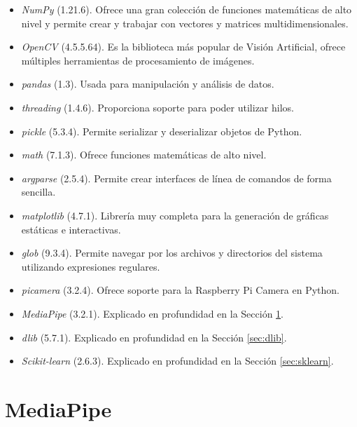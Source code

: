 \begin{itemize}
    \item \textit{NumPy} (1.21.6). Ofrece una gran colección de funciones matemáticas de alto nivel y permite crear y trabajar con vectores y matrices multidimensionales.
    
    \item \textit{OpenCV} (4.5.5.64). Es la biblioteca más popular de Visión Artificial, ofrece múltiples herramientas de procesamiento de imágenes.
    
    \item \textit{pandas} (1.3). Usada para manipulación y análisis de datos.
    
    \item \textit{threading} (1.4.6). Proporciona soporte para poder utilizar hilos.
    
    \item \textit{pickle} (5.3.4). Permite serializar y deserializar objetos de Python.
    
    \item \textit{math} (7.1.3). Ofrece funciones matemáticas de alto nivel.
    
    \item \textit{argparse} (2.5.4). Permite crear interfaces de línea de comandos de forma sencilla.
    
    \item \textit{matplotlib} (4.7.1). Librería muy completa para la generación de gráficas estáticas e interactivas.
    
    \item \textit{glob} (9.3.4). Permite navegar por los archivos y directorios del sistema utilizando expresiones regulares.
    
    \item \textit{picamera} (3.2.4). Ofrece soporte para la Raspberry Pi Camera en Python.
    
    \item \textit{MediaPipe} (3.2.1). Explicado en profundidad en la Sección \ref{sec:mediapipe}.
    
    \item \textit{dlib} (5.7.1). Explicado en profundidad en la Sección \ref{sec:dlib}.
    
    \item \textit{Scikit-learn} (2.6.3). Explicado en profundidad en la Sección \ref{sec:sklearn}.
\end{itemize}

\section{MediaPipe}
\label{sec:mediapipe}

